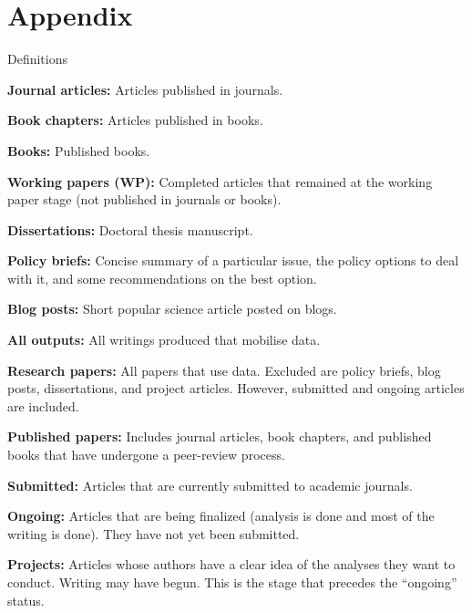 \documentclass[aspectratio=169]{beamer}
\begin{document}
\section*{Appendix}
\begin{frame}


\end{frame}



\begin{frame}[noframenumbering]{Definitions}
\begin{scriptsize}

\textbf{Journal articles:} Articles published in journals.

\textbf{Book chapters:} Articles published in books.

\textbf{Books:} Published books.

\textbf{Working papers (WP):} Completed articles that remained at the working paper stage (not published in journals or books).

\textbf{Dissertations:} Doctoral thesis manuscript.

\textbf{Policy briefs:} Concise summary of a particular issue, the policy options to deal with it, and some recommendations on the best option.

\textbf{Blog posts:} Short popular science article posted on blogs.

\textbf{All outputs:} All writings produced that mobilise data.

\textbf{Research papers:} All papers that use data. Excluded are policy briefs, blog posts, dissertations, and project articles. However, submitted and ongoing articles are included.

\textbf{Published papers:} Includes journal articles, book chapters, and published books that have undergone a peer-review process.

\textbf{Submitted:} Articles that are currently submitted to academic journals.

\textbf{Ongoing:} Articles that are being finalized (analysis is done and most of the writing is done). They have not yet been submitted.

\textbf{Projects:} Articles whose authors have a clear idea of the analyses they want to conduct. Writing may have begun. This is the stage that precedes the ``ongoing'' status.

\end{scriptsize}
\end{frame}











\nocite{*}
\end{document}
